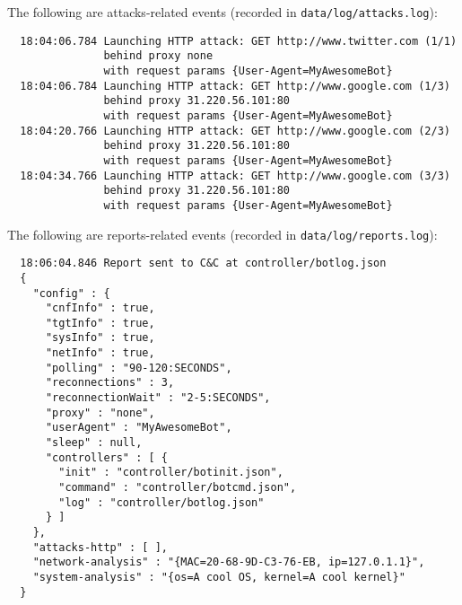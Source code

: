 The following are attacks-related events (recorded in \texttt{data/log/attacks.log}):

\begin{verbatim}
  18:04:06.784 Launching HTTP attack: GET http://www.twitter.com (1/1)
               behind proxy none
               with request params {User-Agent=MyAwesomeBot}
  18:04:06.784 Launching HTTP attack: GET http://www.google.com (1/3)
               behind proxy 31.220.56.101:80
               with request params {User-Agent=MyAwesomeBot}
  18:04:20.766 Launching HTTP attack: GET http://www.google.com (2/3)
               behind proxy 31.220.56.101:80
               with request params {User-Agent=MyAwesomeBot}
  18:04:34.766 Launching HTTP attack: GET http://www.google.com (3/3)
               behind proxy 31.220.56.101:80
               with request params {User-Agent=MyAwesomeBot}

\end{verbatim}

The following are reports-related events (recorded in \texttt{data/log/reports.log}):

\begin{verbatim}
  18:06:04.846 Report sent to C&C at controller/botlog.json
  {
    "config" : {
      "cnfInfo" : true,
      "tgtInfo" : true,
      "sysInfo" : true,
      "netInfo" : true,
      "polling" : "90-120:SECONDS",
      "reconnections" : 3,
      "reconnectionWait" : "2-5:SECONDS",
      "proxy" : "none",
      "userAgent" : "MyAwesomeBot",
      "sleep" : null,
      "controllers" : [ {
        "init" : "controller/botinit.json",
        "command" : "controller/botcmd.json",
        "log" : "controller/botlog.json"
      } ]
    },
    "attacks-http" : [ ],
    "network-analysis" : "{MAC=20-68-9D-C3-76-EB, ip=127.0.1.1}",
    "system-analysis" : "{os=A cool OS, kernel=A cool kernel}"
  }
\end{verbatim}
